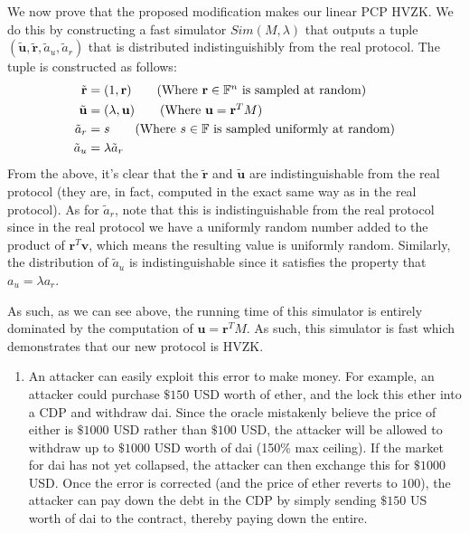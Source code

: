 \documentclass[12pt]{exam}
\newcommand{\Q}[1]{\question{\large{\textbf{#1}}}}
\begin{document}
\begin{questions}
\begin{solution}
\begin{enumerate}[label=\textbf{\alph*.}]
\begin{itemize}
      We now prove that the proposed modification makes our linear PCP HVZK. We do this by constructing a fast simulator $\textit{Sim}(M, \lambda)$ that outputs a tuple $(\tilde{\textbf{u}}, \tilde{\textbf{r}}, \tilde{a}_u, \tilde{a}_r)$ that is distributed indistinguishibly from the real protocol. The tuple is constructed as follows:
      \begin{align*}
        \tilde{\textbf{r}} &= (1, \textbf{r}) \tag{Where $\textbf{r} \in \mathbb{F}^n$ is sampled at random} \\
        \tilde{\textbf{u}} &= (\lambda, \textbf{u}) \tag{Where $\textbf{u} = \textbf{r}^TM$} \\
        \tilde{a}_r &= s \tag{Where $s \in \mathbb{F}$ is sampled uniformly at random} \\
        \tilde{a}_u &= \lambda \tilde{a}_r 
      \end{align*}
      From the above, it's clear that the $\tilde{\textbf{r}}$ and $\tilde{\textbf{u}}$ are indistinguishable from the real protocol (they are, in fact, computed in the exact same way as in the real protocol). As for $\tilde{a}_r$, note that this is indistinguishable from the real protocol since in the real protocol we have a uniformly random number added to the product of $\textbf{r}^T\textbf{v}$, which means the resulting value is uniformly random. Similarly, the distribution of $\tilde{a}_u$ is indistinguishable since it satisfies the property that $a_u = \lambda a_r$.

      As such, as we can see above, the running time of this simulator is entirely dominated by the computation of $\textbf{u} = \textbf{r}^T M$. As such, this simulator is fast which demonstrates that our new protocol is HVZK.
    \end{itemize}
  \end{enumerate}
\end{solution}


\newpage
\Q{Problem 4}
\begin{solution}
\begin{enumerate}[label=\textbf{\alph*.}]
  \item An attacker can easily exploit this error to make money. For example, an attacker could purchase $\$150$ USD worth of ether, and the lock this ether into a CDP and withdraw dai. Since the oracle mistakenly believe the price of either is $\$1000$ USD rather than $\$100$ USD, the attacker will be allowed to withdraw up to $\$ 1000$ USD worth of dai (150\% max ceiling). If the market for dai has not yet collapsed, the attacker can then exchange this for $\$1000$ USD. Once the error is corrected (and the price of ether reverts to $100$), the attacker can pay down the debt in the CDP by simply sending $\$150$ US worth of dai to the contract, thereby paying down the entire.


\end{enumerate}
\end{solution}
\end{questions}
\end{document}
